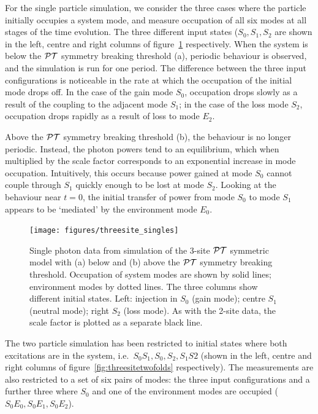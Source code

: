 For the single particle simulation, we consider the three cases where the
particle initially occupies a system mode, and measure occupation of all six
modes at all stages of the time evolution. The three different input states
(\(S_{0}, S_{1}, S_{2}\) are shown in the left, centre and right columns of
figure~\ref{fig:threesitesingles} respectively. When the system is below the
\(\mathcal{PT}\) symmetry breaking threshold (a), periodic behaviour is observed, and the
simulation is run for one period. The difference between the three input
configurations is noticeable in the rate at which the occupation of the initial
mode drops off. In the case of the gain mode \(S_{0}\), occupation drops slowly
as a result of the coupling to the adjacent mode \(S_{1}\); in the case of the
loss mode \(S_{2}\), occupation drops rapidly as a result of loss to mode
\(E_{2}\).

Above the \(\mathcal{PT}\) symmetry breaking threshold (b), the behaviour is no longer
periodic. Instead, the photon powers tend to an equilibrium, which when
multiplied by the scale factor corresponds to an exponential increase in mode
occupation. Intuitively, this occurs because power gained at mode \(S_{0}\)
cannot couple through \(S_{1}\) quickly enough to be lost at mode \(S_{2}\).
Looking at the behaviour near \(t=0\), the initial transfer of power from mode
\(S_{0}\) to mode \(S_{1}\) appears to be `mediated' by the environment mode
\(E_{0}\).

\begin{figure}[p]
  \centering
  \texttt{[image: figures/threesite\_singles]}
  \caption[Single photon data from simulation of the 3-site PT symmetric model]
  {Single photon data from simulation of the 3-site \(\mathcal{PT}\) symmetric model with
  (a) below and (b) above the \(\mathcal{PT}\) symmetry breaking threshold. Occupation of
  system modes are shown by solid lines; environment modes by dotted lines. The
  three columns show different initial states. Left: injection in \(S_{0}\)
  (gain mode); centre \(S_{1}\) (neutral mode); right \(S_{2}\) (loss mode). As
  with the 2-site data, the scale factor is plotted as a separate black line.}
  \label{fig:threesitesingles}
\end{figure}

The two particle simulation has been restricted to initial states where both
excitations are in the system, i.e.\ \(S_{0}S_{1}, S_{0},S_{2}, S_{1}S{2}\)
(shown in the left, centre and right columns of
figure~\ref{fig:threesitetwofolds} respectively). The measurements are also
restricted to a set of six pairs of modes: the three input configurations and a
further three where \(S_{0}\) and one of the environment modes are occupied
(\(S_{0}E_{0}, S_{0}E_{1}, S_{0}E_{2}\)).

